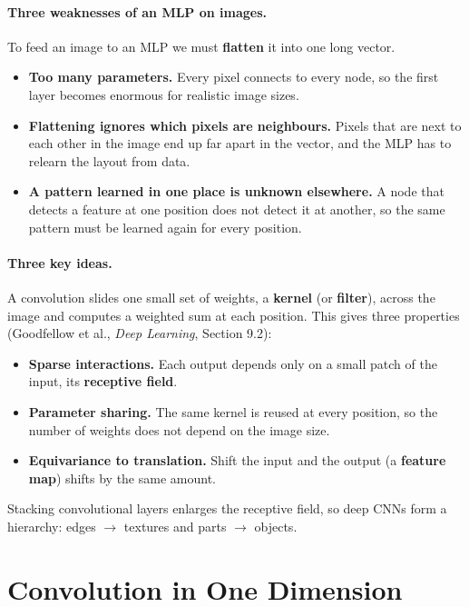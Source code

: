 \documentclass[12pt, a4paper]{article}
\begin{document}
\paragraph{Three weaknesses of an MLP on images.}
To feed an image to an MLP we must \textbf{flatten} it into one long vector.
\begin{itemize}[nosep]
  \item \textbf{Too many parameters.} Every pixel connects to every node, so
        the first layer becomes enormous for realistic image sizes.
  \item \textbf{Flattening ignores which pixels are neighbours.} Pixels that
        are next to each other in the image end up far apart in the vector,
        and the MLP has to relearn the layout from data.
  \item \textbf{A pattern learned in one place is unknown elsewhere.} A node
        that detects a feature at one position does not detect it at another,
        so the same pattern must be learned again for every position.
\end{itemize}

\paragraph{Three key ideas.}
A convolution slides one small set of weights, a \textbf{kernel} (or
\textbf{filter}), across the image and computes a weighted sum at each
position. This gives three properties (Goodfellow et al., \emph{Deep
  Learning}, Section 9.2):
\begin{itemize}[nosep]
  \item \textbf{Sparse interactions.} Each output depends only on a small
        patch of the input, its \textbf{receptive field}.
  \item \textbf{Parameter sharing.} The same kernel is reused at every
        position, so the number of weights does not depend on the image
        size.
  \item \textbf{Equivariance to translation.} Shift the input and the output
        (a \textbf{feature map}) shifts by the same amount.
\end{itemize}
Stacking convolutional layers enlarges the receptive field, so deep CNNs form
a hierarchy: edges $\to$ textures and parts $\to$ objects.

\section{Convolution in One Dimension}
\end{document}
